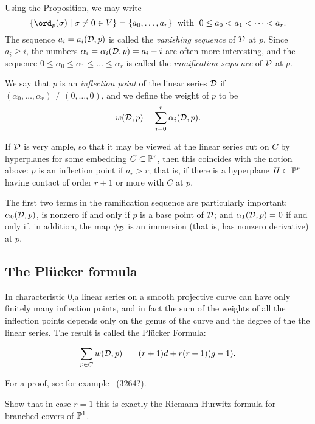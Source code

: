 Using the Proposition, we may write
$$
\{ \ord_p(\sigma) \mid \sigma \neq 0 \in V \} = \{a_0,\dots,a_r\} \; \text{ with } \; 0\leq a_0 < a_1 < \dots < a_r.
$$
The sequence $a_i = a_i(\cD,p)$ is called the \emph{vanishing sequence} of $\cD$ at $p$.  Since $a_i \geq i$, the numbers $\alpha_i = \alpha_i(\cD,p) = a_i - i$ are often more interesting, and the sequence $0 \leq \alpha_0 \leq \alpha_1 \leq \dots \leq \alpha_r$ is called the \emph{ramification sequence} of $\cD$ at $p$. 

We say that $p$ is an \emph{inflection point} of the linear series $\cD$ if $(\alpha_0,\dots,\alpha_r) \neq (0,\dots,0)$, and we define the weight of $p$ to be
$$
w(\cD, p) = \sum_{i=0}^r \alpha_i(\cD, p).
$$

If $\cD$ is very ample, so that it may be viewed at the linear series cut on $C$ by hyperplanes for some embedding $C \subset \PP^r$, then this coincides with the notion above: $p$ is an inflection point if $a_r > r$; that is, if there is a hyperplane $H \subset \PP^r$ having contact of order $r+1$ or more with $C$ at $p$.

The first two terms in the ramification sequence are particularly important: $\alpha_0(\cD, p)$, is nonzero if and only if $p$ is a base point of $\cD$; and $\alpha_1(\cD, p) = 0$ if and only if, in addition, the map $\phi_\cD$ is an immersion (that is, has nonzero derivative) at $p$.


\subsection{The Pl\"ucker formula}

In characteristic 0,a linear series on a smooth projective curve can have only finitely many inflection points, and in fact the sum of the weights of all the inflection points depends only on the genus of the curve and the degree of the the linear series. The result is called the Pl\"ucker Formula:

\begin{theorem}
 \begin{equation}\label{Plucker formula}
\sum_{p \in C} w(\cD, p) \; = \; (r+1)d + r(r+1)(g-1).
\end{equation}
\end{theorem}
For a proof, see for example~\cite{} (3264?). 

\begin{exercise}
Show that in case $r=1$ this is exactly the Riemann-Hurwitz formula for branched covers of $\PP^1$.
\end{exercise}

